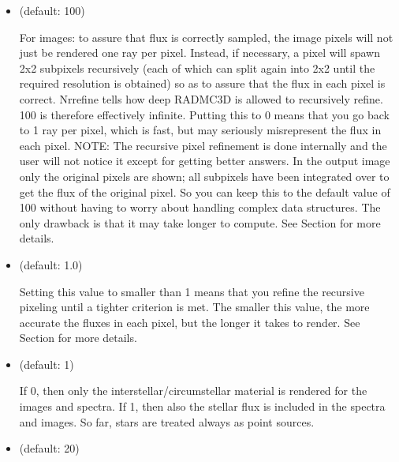 \documentclass[letterpaper,10pt,english]{sphinxmanual}
\begin{document}
\begin{itemize}
\item {} 
 (default: 100)

For images: to assure that flux is correctly sampled, the image pixels
will not just be rendered one ray per pixel. Instead, if necessary,
a pixel will spawn 2x2 sub\sphinxhyphen{}pixels recursively (each of which can
split again into 2x2 until the required resolution is obtained) so
as to assure that the flux in each pixel is correct. Nrrefine tells
how deep RADMC\sphinxhyphen{}3D is allowed to recursively refine. 100 is therefore
effectively infinite. Putting this to 0 means that you go back to
1 ray per pixel, which is fast, but may seriously misrepresent the flux
in each pixel. NOTE: The recursive pixel refinement is done internally
and the user will not notice it except for getting better answers. In
the output image only the original pixels are shown; all subpixels have
been integrated over to get the flux of the original pixel. So you can
keep this to the default value of 100 without having to worry about
handling complex data structures. The only drawback is that it may take
longer to compute. See Section {\hyperref[\detokenize{imagesspectra:sec-image-refinement}]{}} for more details.

\item {} 
 (default: 1.0) 

Setting this value to smaller than 1 means that you refine the recursive
pixeling until a tighter criterion is met. The smaller this value, the
more accurate the fluxes in each pixel, but the longer it takes to
render. See Section {\hyperref[\detokenize{imagesspectra:sec-image-refinement}]{}} for more details.

\item {} 
 (default: 1)

If 0, then only the interstellar/circumstellar material is rendered
for the images and spectra. If 1, then also the stellar flux is
included in the spectra and images. So far, stars are treated always
as point sources.

\item {} 
 (default: 20) 


\end{itemize}
\end{document}
